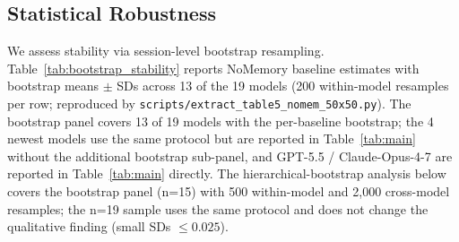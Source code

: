 \documentclass[11pt]{article}
\begin{document}
\subsection{Statistical Robustness}
\label{app:stat_rob}

We assess stability via session-level bootstrap resampling. Table~\ref{tab:bootstrap_stability} reports NoMemory baseline estimates with bootstrap means $\pm$ SDs across 13 of the 19 models (200 within-model resamples per row; reproduced by \texttt{scripts/extract\_table5\_nomem\_50x50.py}). The bootstrap panel covers 13 of 19 models with the per-baseline bootstrap; the 4 newest models use the same protocol but are reported in Table~\ref{tab:main} without the additional bootstrap sub-panel, and GPT-5.5 / Claude-Opus-4-7 are reported in Table~\ref{tab:main} directly. The hierarchical-bootstrap analysis below covers the bootstrap panel (n=15) with 500 within-model and 2{,}000 cross-model resamples; the n=19 sample uses the same protocol and does not change the qualitative finding (small SDs $\leq 0.025$).
\end{document}
